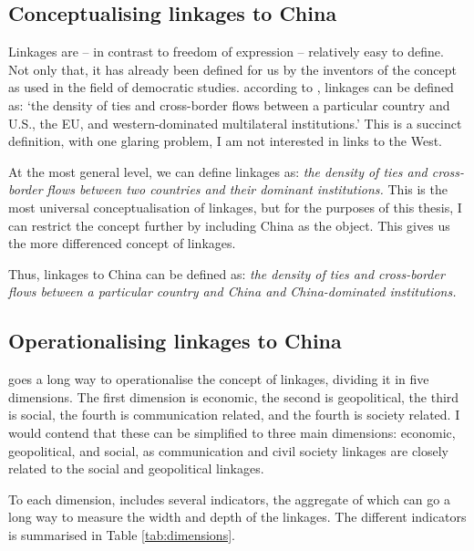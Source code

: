 \subsection{Conceptualising linkages to China}
Linkages are -- in contrast to freedom of expression -- relatively easy to define. Not only that, it has already been defined for us by the inventors of the concept as used in the field of democratic studies. according to \citet[pp. 383-384]{levitsky_linkage_2006}, linkages can be defined as: `the density of ties and cross-border flows between a particular country and U.S., the EU, and western-dominated multilateral institutions.' \citep[p. 383]{levitsky_linkage_2006} This is a succinct definition, with one glaring problem, I am not interested in links to the West. 

At the most general level, we can define linkages as: \textit{the density of ties and cross-border flows between two countries and their dominant institutions.} This is the most universal conceptualisation of linkages, but for the purposes of this thesis, I can restrict the concept further by including China as the object. This gives us the more differenced concept of linkages.

Thus, linkages to China can be defined as: \textit{the density of ties and cross-border flows between a particular country and China and China-dominated institutions.}

\subsection{Operationalising linkages to China} \label{sec:fbic}
\citet{levitsky_linkage_2006} goes a long way to operationalise the concept of linkages, dividing it in five dimensions. The first dimension is economic, the second is geopolitical, the third is social, the fourth is communication related, and the fourth is society related. I would contend that these can be simplified to three main dimensions: economic, geopolitical, and social, as communication and civil society linkages are closely related to the social and geopolitical linkages. 

To each dimension, \citet{levitsky_linkage_2006} includes several indicators, the aggregate of which can go a long way to measure the width and depth of the linkages. The different indicators is summarised in Table \ref{tab:dimensions}. 

